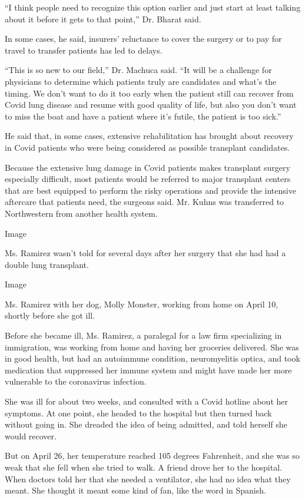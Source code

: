 ``I think people need to recognize this option earlier and just start at
least talking about it before it gets to that point,'' Dr. Bharat said.

In some cases, he said, insurers' reluctance to cover the surgery or to
pay for travel to transfer patients has led to delays.

``This is so new to our field,'' Dr. Machuca said. ``It will be a
challenge for physicians to determine which patients truly are
candidates and what's the timing. We don't want to do it too early when
the patient still can recover from Covid lung disease and resume with
good quality of life, but also you don't want to miss the boat and have
a patient where it's futile, the patient is too sick.''

He said that, in some cases, extensive rehabilitation has brought about
recovery in Covid patients who were being considered as possible
transplant candidates.

Because the extensive lung damage in Covid patients makes transplant
surgery especially difficult, most patients would be referred to major
transplant centers that are best equipped to perform the risky
operations and provide the intensive aftercare that patients need, the
surgeons said. Mr. Kuhns was transferred to Northwestern from another
health system.

Image

Ms. Ramirez wasn't told for several days after her surgery that she had
had a double lung transplant.

Image

Ms. Ramirez with her dog, Molly Monster, working from home on April 10,
shortly before she got ill.

Before she became ill, Ms. Ramirez, a paralegal for a law firm
specializing in immigration, was working from home and having her
groceries delivered. She was in good health, but had an autoimmune
condition, neuromyelitis optica, and took medication that suppressed her
immune system and might have made her more vulnerable to the coronavirus
infection.

She was ill for about two weeks, and consulted with a Covid hotline
about her symptoms. At one point, she headed to the hospital but then
turned back without going in. She dreaded the idea of being admitted,
and told herself she would recover.

But on April 26, her temperature reached 105 degrees Fahrenheit, and she
was so weak that she fell when she tried to walk. A friend drove her to
the hospital. When doctors told her that she needed a ventilator, she
had no idea what they meant. She thought it meant some kind of fan, like
the word in Spanish.

